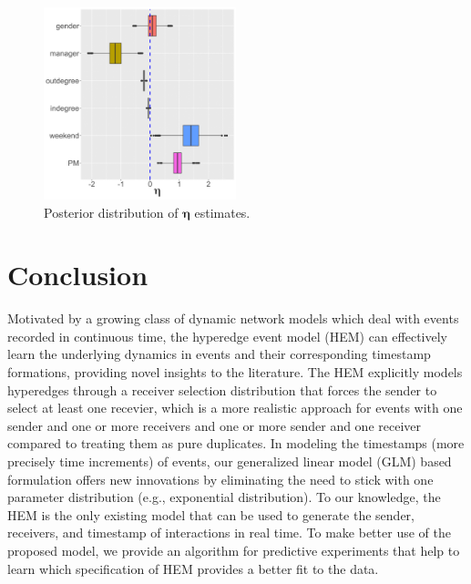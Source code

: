 \documentclass[ba]{imsart}
\numberwithin{equation}{section}
\theoremstyle{plain}
\begin{document}
			\begin{figure}[!t]
				\centering
				\includegraphics[width=0.4975\textwidth]{img/etaplotnew-1.png}	
				\caption {Posterior distribution of $\boldsymbol{\eta}$ estimates.}
				\label{figure:etaresults}
			\end{figure}	
	\section{Conclusion}\label{sec:conclusion}
	Motivated by a growing class of dynamic network models which deal with events recorded in continuous time, the hyperedge event model (HEM) can effectively learn the underlying dynamics in events and their corresponding timestamp formations, providing novel insights to the literature. The HEM explicitly models hyperedges through a receiver selection distribution that forces the sender to select at least one recevier, which is a more realistic approach for events with one sender and one or more receivers and one or more sender and one receiver compared to treating them as pure duplicates. In modeling the timestamps (more precisely time increments) of events, our generalized linear model (GLM) based formulation offers new innovations by eliminating the need to stick with one parameter distribution (e.g., exponential distribution). To our knowledge, the HEM is the only existing model that can be used to generate the sender, receivers, and timestamp of interactions in real time. To make better use of the proposed model, we provide an algorithm for predictive experiments that help to learn which specification of HEM provides a better fit to the data. 
	
\end{document}
